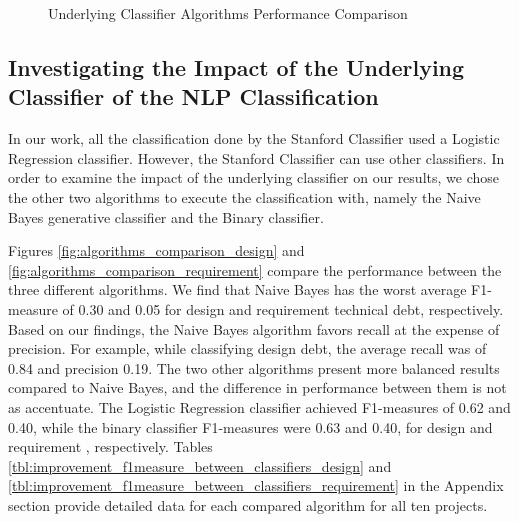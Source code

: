\begin{figure}[!thb]
  \centering
  \caption{Underlying Classifier Algorithms Performance Comparison}
  \label{fig:algorithms_comparison}
\end{figure}

\subsection{Investigating the Impact of the Underlying Classifier of the NLP Classification}
\label{sec:underlying_classifier}
In our work, all the classification done by the Stanford Classifier used a Logistic Regression classifier. However, the Stanford Classifier can use other classifiers. In order to examine the impact of the underlying classifier on our results, we chose the other two algorithms to execute the classification with, namely the Naive Bayes generative classifier and the Binary classifier.
 
Figures \ref{fig:algorithms_comparison_design} and \ref{fig:algorithms_comparison_requirement} compare the performance between the three different algorithms. We find that Naive Bayes has the worst average F1-measure of 0.30 and 0.05 for design and requirement technical debt, respectively. Based on our findings, the Naive Bayes algorithm favors recall at the expense of precision. For example, while classifying design debt, the average recall was of 0.84 and precision 0.19. The two other algorithms present more balanced results compared to Naive Bayes, and the difference in performance between them is not as accentuate. The Logistic Regression classifier achieved F1-measures of 0.62 and 0.40, while the binary classifier F1-measures were 0.63 and 0.40, for design and requirement \SATD, respectively. Tables \ref{tbl:improvement_f1measure_between_classifiers_design} and \ref{tbl:improvement_f1measure_between_classifiers_requirement} in the Appendix section provide detailed data for each compared algorithm for all ten projects.

